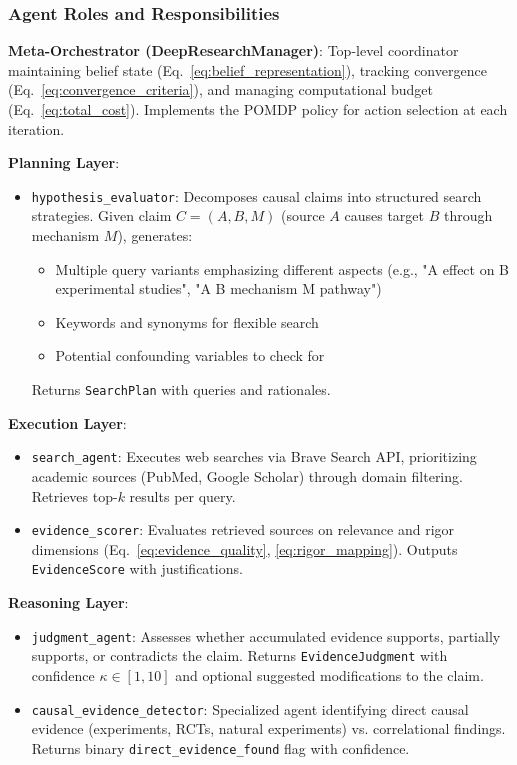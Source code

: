 \subsubsection{Agent Roles and Responsibilities}

\textbf{Meta-Orchestrator (DeepResearchManager)}: Top-level coordinator maintaining belief state (Eq.~\ref{eq:belief_representation}), tracking convergence (Eq.~\ref{eq:convergence_criteria}), and managing computational budget (Eq.~\ref{eq:total_cost}). Implements the POMDP policy for action selection at each iteration.

\textbf{Planning Layer}:
\begin{itemize}
    \item \texttt{hypothesis\_evaluator}: Decomposes causal claims into structured search strategies. Given claim $C = (A, B, M)$ (source $A$ causes target $B$ through mechanism $M$), generates:
    \begin{itemize}
        \item Multiple query variants emphasizing different aspects (e.g., "A effect on B experimental studies", "A B mechanism M pathway")
        \item Keywords and synonyms for flexible search
        \item Potential confounding variables to check for
    \end{itemize}
    Returns \texttt{SearchPlan} with queries and rationales.
\end{itemize}

\textbf{Execution Layer}:
\begin{itemize}
    \item \texttt{search\_agent}: Executes web searches via Brave Search API, prioritizing academic sources (PubMed, Google Scholar) through domain filtering. Retrieves top-$k$ results per query.
    
    \item \texttt{evidence\_scorer}: Evaluates retrieved sources on relevance and rigor dimensions (Eq.~\ref{eq:evidence_quality}, \ref{eq:rigor_mapping}). Outputs \texttt{EvidenceScore} with justifications.
\end{itemize}

\textbf{Reasoning Layer}:
\begin{itemize}
    \item \texttt{judgment\_agent}: Assesses whether accumulated evidence supports, partially supports, or contradicts the claim. Returns \texttt{EvidenceJudgment} with confidence $\kappa \in [1, 10]$ and optional suggested modifications to the claim.
    
    \item \texttt{causal\_evidence\_detector}: Specialized agent identifying direct causal evidence (experiments, RCTs, natural experiments) vs. correlational findings. Returns binary \texttt{direct\_evidence\_found} flag with confidence.
\end{itemize}

